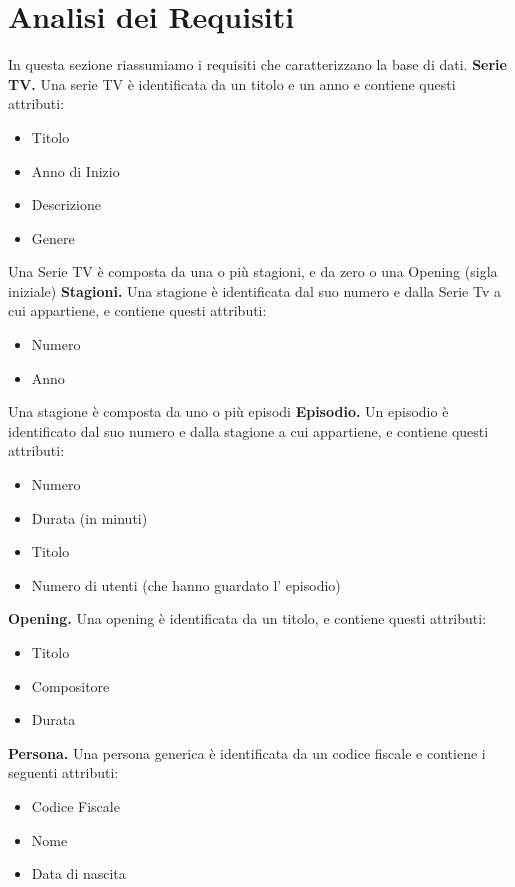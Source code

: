 \documentclass[10pt,a4paper]{article}
\begin{document}
\section{Analisi dei Requisiti}
In questa sezione riassumiamo i requisiti che caratterizzano la base di dati.\newline\newline
\textbf{Serie TV.} Una serie TV è identificata da un titolo e un anno e contiene questi attributi:
\begin{itemize}
  \item Titolo
  \item Anno di Inizio
  \item Descrizione
  \item Genere
\end{itemize}
Una Serie TV è composta da una o più stagioni, e da zero o una Opening (sigla iniziale) \newline\newline
\textbf{Stagioni.} Una stagione è identificata dal suo numero e dalla Serie Tv a cui appartiene, e contiene questi attributi:
\begin{itemize}
    \item Numero
    \item Anno
\end{itemize}
Una stagione è composta da uno o più episodi\newline\newline
\textbf{Episodio.} Un episodio è identificato dal suo numero e dalla stagione a cui appartiene, e contiene questi attributi:
\begin{itemize}
    \item Numero
    \item Durata (in minuti)
    \item Titolo
    \item Numero di utenti (che hanno guardato l' episodio)
\end{itemize}
\textbf{Opening.} Una opening è identificata da un titolo, e contiene questi attributi:
\begin{itemize}
    \item Titolo
    \item Compositore
    \item Durata
\end{itemize}
\textbf{Persona.} Una persona generica è identificata da un codice fiscale e contiene i seguenti attributi: 
\begin{itemize}
    \item Codice Fiscale
    \item Nome
    \item Data di nascita
\end{itemize}
\end{document}
